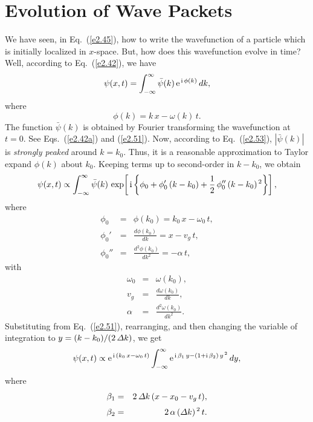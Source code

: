 \section{Evolution of Wave Packets}\label{exp}
We have seen, in Eq.~(\ref{e2.45}), how to write the wavefunction of
a particle which is initially localized in  $x$-space. 
But,
how does this wavefunction evolve in time? 
Well, according to Eq.~(\ref{e2.42}), we have
\begin{equation}\label{e2.56}
\psi(x,t) = \int_{-\infty}^{\infty} \bar{\psi}(k)\,{\rm e}^{\,{\rm i}\,\phi(k)}\,dk,
\end{equation}
where
\begin{equation}
\phi(k) = k\,x - \omega(k)\,t.
\end{equation}
The function $\bar{\psi}(k)$ is obtained by Fourier transforming the
wavefunction at $t=0$. See Eqs.~(\ref{e2.42a}) and (\ref{e2.51}). Now,
according to Eq.~(\ref{e2.53}), $|\bar{\psi}(k)|$
is {\em strongly peaked}\/ around $k=k_0$. Thus, it is a reasonable approximation
to Taylor expand $\phi(k)$ about $k_0$. Keeping terms up to
second-order in $k-k_0$, we obtain
\begin{equation}
 \psi(x,t)\propto \int_{-\infty}^{\infty} \bar{\psi}(k)\,
\exp\!\left[\,{\rm i}\left\{\phi_0+ \phi_0'\,(k-k_0) + \frac{1}{2}\,\phi_0''\,(k-k_0)^{\,2}\right\}\right],
\end{equation}
where
\begin{eqnarray}
\phi_0 &=& \phi(k_0) = k_0\,x-\omega_0\,t,\\[0.5ex]
\phi_0'&=& \frac{d\phi(k_0)}{dk} = x - v_g\,t,\\[0.5ex]
\phi_0''&=&\frac{d^2\phi(k_0)}{dk^2} = - \alpha\,t,
\end{eqnarray}
with
\begin{eqnarray}
\omega_0 &=& \omega(k_0),\\[0.5ex]
v_g &=& \frac{d\omega(k_0)}{dk},\\[0.5ex]
\alpha &=& \frac{d^2\omega(k_0)}{dk^2}.\label{e2.64}
\end{eqnarray}
Substituting from Eq.~(\ref{e2.51}), rearranging, and then changing the variable of integration to $y=(k-k_0)/(2\,{\mit\Delta}k)$,
we get
\begin{equation}
\psi(x,t)\propto {\rm e}^{\,{\rm i}\,(k_0\,x-\omega_0\,t)}
\int_{-\infty}^{\infty}{\rm e}^{\, {\rm i}\,\beta_1\,y-(1+{\rm i}\,\beta_2)\,y^{\,2}}\,dy,
\end{equation}
where
\begin{eqnarray}
\beta_1 &=& 2\,{\mit\Delta}k\,(x-x_0-v_g\,t),\\[0.5ex]
\beta_2&=& 2\,\alpha\,({\mit\Delta}k)^{\,2}\,t.
\end{eqnarray}
